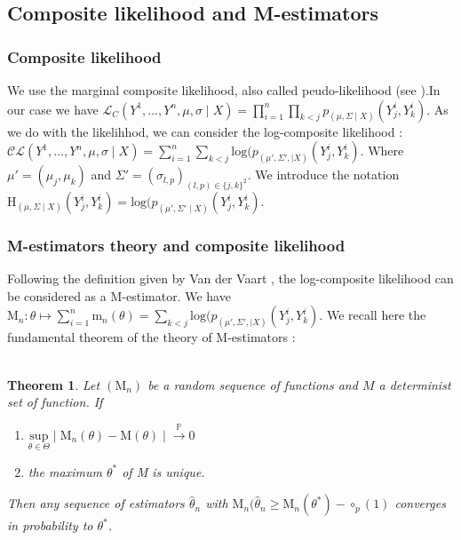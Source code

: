 \documentclass[11pt, a4paper]{article}
\newtheorem{theorem}{Theorem}
\begin{document}
\subsection{Composite likelihood and M-estimators}
\subsubsection{Composite likelihood}
We use the marginal composite likelihood, also called peudo-likelihood (see \cite{varin2011overview}).In our case we have $\mathcal{L}_C(Y^1,..., Y^n,\mu,\sigma \mid X) = \prod_{i=1}^{n} \prod_{k<j} p_{(\mu,\Sigma \mid X)}{(Y^i_j,Y^i_k)}$. As we do with the likelihhod, we can consider the log-composite likelihood :
$\mathcal{CL}(Y^1,..., Y^n,\mu,\sigma \mid X) = \sum_{i=1}^{n} \sum_{k<j} \mathrm{log}(p_{(\mu',\Sigma', \mid X)}(Y^i_j,Y^i_k)$. Where $\mu'=(\mu_j,\mu_k)$ and $ \Sigma' =(\sigma_{l,p})_{(l,p) \in \{j,k\}^2} $. We introduce the notation $\mathrm{H}_{(\mu,\Sigma \mid X)}(Y^i_j,Y^i_k)=\mathrm{log}(p_{(\mu',\Sigma' \mid X)}(Y^i_j,Y^i_k)$. 
\subsubsection{M-estimators theory and composite likelihood}
Following the definition given by Van der Vaart \cite{vaart_1998}, the log-composite likelihood can be considered as a M-estimator. We have $\mathrm{M}_n : \theta \mapsto \sum_{i=1}^{n} \mathrm{m}_n(\theta)= \sum_{k<j} \mathrm{log}(p_{(\mu',\Sigma', \mid X)}(Y^i_j,Y^i_k)$. We recall here the fundamental theorem of the theory of M-estimators :\\
\\
\begin{theorem} \label{ThMest}
Let $(\mathrm{M}_n)$ be a random sequence of functions and $M$ a determinist set of function. If 
\begin{enumerate}
\item $\underset{\theta \in \Theta}{\mathrm{sup}} \mid \mathrm{M}_n(\theta)-\mathrm{M}(\theta) \mid \overset{\mathbb{P}}{\longrightarrow} 0$
\item the maximum $\theta^\ast$ of M is unique.
\end{enumerate}
Then any sequence of estimators $\widehat{\theta}_n$ with $\mathrm{M}_n(\widehat{\theta}_n \geq \mathrm{M}_n(\theta^\ast)-\circ_p(1)$ converges in probability to $\theta^\ast$.
\end{theorem}
\end{document}
